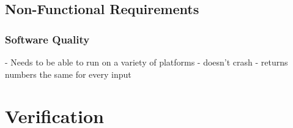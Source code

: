 \documentclass[10pt,draftclsnofoot,onecolumn]{IEEEtran}
\begin{document}
\subsection{Non-Functional Requirements}
\subsubsection{}
\subsubsection{Software Quality}
- Needs to be able to run on a variety of platforms
- doesn't crash
- returns numbers the same for every input

\section{Verification}
\end{document}
